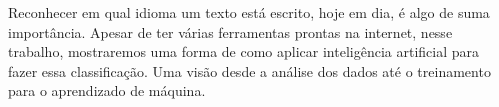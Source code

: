 \begin{resumo}
Reconhecer em qual idioma um texto está escrito, hoje em dia, é algo de suma importância. Apesar de ter várias ferramentas prontas na internet, nesse trabalho, mostraremos uma forma de como aplicar inteligência artificial para fazer essa classificação. Uma visão desde a análise dos dados até o treinamento para o aprendizado de máquina.
\end{resumo}